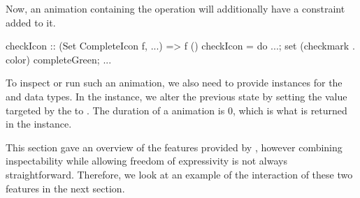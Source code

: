 Now, an animation containing the  operation will additionally have a  constraint added to it.

\begin{code}
checkIcon :: (Set CompleteIcon f, ...) => f ()
checkIcon = do ...; set (checkmark . color) completeGreen; ...
\end{code}

To inspect or run such an animation, we also need to provide instances for the  and  data types. In the  instance, we alter the previous state by setting the value targeted by the  to . The duration of a  animation is 0, which is what is returned in the  instance.


This section gave an overview of the features provided by \dsl{}, however combining inspectability while allowing freedom of expressivity is not always straightforward. Therefore, we look at an example of the interaction of these two features in the next section.
